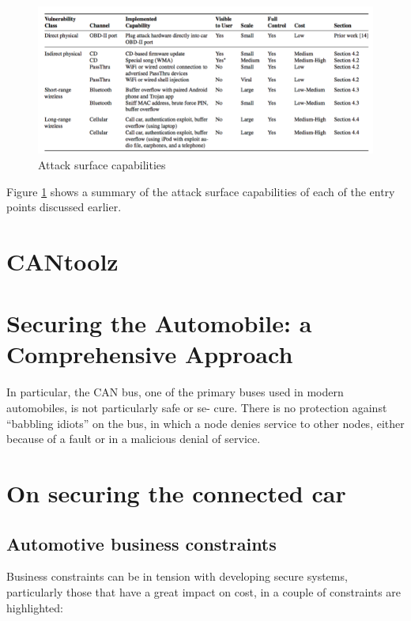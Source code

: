 \documentclass[11pt]{article}
\begin{document}
\begin{figure}[h]
	\caption{Attack surface capabilities}
	\label{fig:atksrfc}
	\centering
	\includegraphics[width=\textwidth]{AttackSurface}
\end{figure}

Figure \ref{fig:atksrfc} shows a summary of the attack surface capabilities of each of the entry points discussed earlier.

\section{CANtoolz}

\cite{Sintsov}

\section{Securing the Automobile: a Comprehensive Approach}

In particular, the CAN bus, one of the primary buses used in modern automobiles, is not particularly safe or se- cure. There is no protection against “babbling idiots” on the bus, in which a node denies service to other nodes, either because of a fault or in a malicious denial of service.

\section{On securing the connected car}

\subsection{Automotive business constraints}

Business constraints can be in tension with developing secure systems, particularly those that have a great impact on cost, in \cite{Pike15} a couple of constraints are highlighted:
\end{document}
